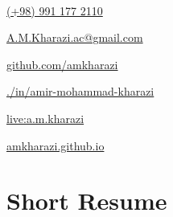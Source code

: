\documentclass[lighthipster]{simplehipstercv}
\begin{document}
\begin{paracol}{2}
{\bigskip

\vfill

\\[0.5em]
\justifying
\begin{spacing}{1.5}
	
	{\hspace{0.55mm}\large\faMobilePhone}\hspace{2mm}\href{tel:+989911772110}{(+98) 991 177 2110}
	
	{\faEnvelopeO}\hspace{2mm}\href{mailto: a.m.kharazi.ac@gmail.com}{A.M.Kharazi.ac@gmail.com}
	
	{\hspace{0.1mm}\faGithub}\hspace{2mm}\href{https://github.com/amkharazi}{github.com/amkharazi}
	
	{\hspace{0.55mm}\faLinkedin}\hspace{2mm}\href{www.linkedin.com/in/amir-mohammad-kharazi}{./in/amir-mohammad-kharazi}
	
	{\hspace{0.7mm}\faSkype}\hspace{2mm}\href{live:a.m.kharazi}{live:a.m.kharazi}
	
	{\hspace{0.7mm}\faGlobe}\hspace{2mm}\href{https://amkharazi.github.io/}{amkharazi.github.io}
	
\end{spacing}


\phantom{turn the page}

\phantom{turn the page}
}
\switchcolumn

\small
\section*{Short Resume}

\begin{itemize}
	

\end{itemize}
\end{paracol}
\end{document}
